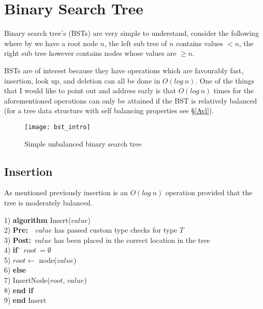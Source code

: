 \chapter{Binary Search Tree} \label{bst}
Binary search tree's (BSTs) are very simple to understand, consider the following where by we have a root node $n$, the left sub tree of $n$ contains values $< n$, the right sub tree however contains nodes whose values are $\geq n$.

BSTs are of interest because they have operations which are favourably fast, insertion, look up, and deletion can all be done in $O(log~n)$. One of the things that I would like to point out and address early is that $O(log~n)$ times for the aforementioned operations can only be attained if the BST is relatively balanced (for a tree data structure with self balancing properties see \S\ref{Avl}). 
\begin{figure}[htp]
\begin{center}
\texttt{[image: bst\_intro]}
\end{center}
\caption{Simple unbalanced binary search tree} \label{fig:bst_intro}
\end{figure}



\section{Insertion}
As mentioned previously insertion is an $O(log~n)$ operation provided that the tree is moderately balanced.

\begin{tabbing}
1)  \textbf{alg}\= \textbf{orithm} Insert($value$) \\
2)  \> \textbf{Pre:}~~$value$ has passed custom type checks for type $T$ \\
3)  \> \textbf{Post:}~$value$ has been placed in the correct location in the tree \\
4)  \> \textbf{if}~\= $root~= \emptyset$ \\
5)  \> \> $root \leftarrow$ node($value$) \\
6)  \> \textbf{else} \\
7)  \> \> InsertNode($root$, $value$) \\
8)  \> \textbf{end if} \\
9)  \textbf{end} Insert \\
\end{tabbing}

